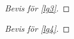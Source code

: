 \begin{proof}[Bevis för \eqref{lg3}]
	
\end{proof}

\begin{proof}[Bevis för \eqref{lg4}]
	
\end{proof}










































































